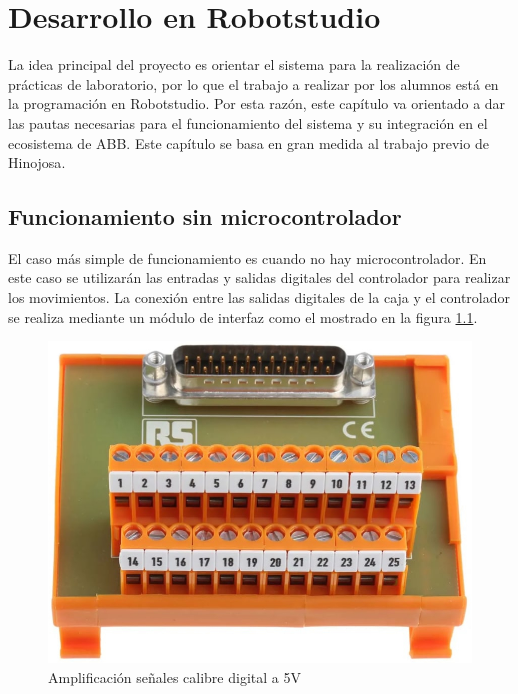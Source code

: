 \chapter{Desarrollo en Robotstudio}\label{chp-06}

La idea principal del proyecto es orientar el sistema para la realización de prácticas de 
laboratorio, por lo que el trabajo a realizar por los alumnos está en la programación en 
Robotstudio. Por esta razón, este capítulo va orientado a dar las pautas necesarias para el 
funcionamiento del sistema y su integración en el ecosistema de ABB. Este capítulo se basa 
en gran medida al trabajo previo de Hinojosa\cite{rea}.

\section{Funcionamiento sin microcontrolador}

El caso más simple de funcionamiento es cuando no hay microcontrolador. En este caso se
utilizarán las entradas y salidas digitales del controlador para realizar los movimientos.
La conexión entre las salidas digitales de la caja y el controlador se realiza mediante 
un módulo de interfaz como el mostrado en la figura \ref{fig:interfazfisicadigital}.

\begin{figure}[hbtp]
    \centering
    \includegraphics[width=\textwidth/2]{06-robotstudio/interfazdigital.jpg}
    \caption{Amplificación señales calibre digital a 5V}
    \label{fig:interfazfisicadigital}
    \end{figure}

